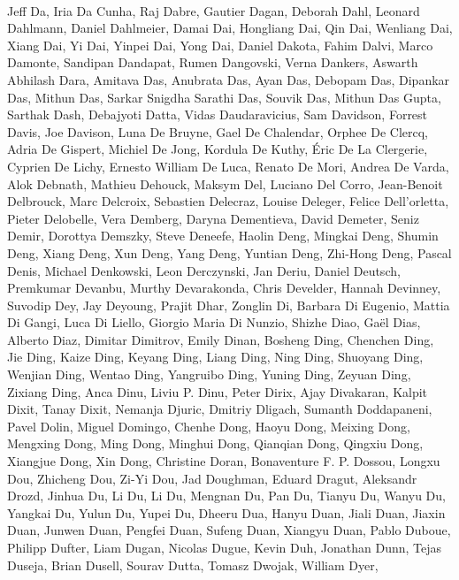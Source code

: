 \paragraph{}Jeff Da, Iria Da Cunha, Raj Dabre, Gautier Dagan, Deborah Dahl, Leonard Dahlmann, Daniel Dahlmeier, Damai Dai, Hongliang Dai, Qin Dai, Wenliang Dai, Xiang Dai, Yi Dai, Yinpei Dai, Yong Dai, Daniel Dakota, Fahim Dalvi, Marco Damonte, Sandipan Dandapat, Rumen Dangovski, Verna Dankers, Aswarth Abhilash Dara, Amitava Das, Anubrata Das, Ayan Das, Debopam Das, Dipankar Das, Mithun Das, Sarkar Snigdha Sarathi Das, Souvik Das, Mithun Das Gupta, Sarthak Dash, Debajyoti Datta, Vidas Daudaravicius, Sam Davidson, Forrest Davis, Joe Davison, Luna De Bruyne, Gael De Chalendar, Orphee De Clercq, Adria De Gispert, Michiel De Jong, Kordula De Kuthy, Éric De La Clergerie, Cyprien De Lichy, Ernesto William De Luca, Renato De Mori, Andrea De Varda, Alok Debnath, Mathieu Dehouck, Maksym Del, Luciano Del Corro, Jean-Benoit Delbrouck, Marc Delcroix, Sebastien Delecraz, Louise Deleger, Felice Dell'orletta, Pieter Delobelle, Vera Demberg, Daryna Dementieva, David Demeter, Seniz Demir, Dorottya Demszky, Steve Deneefe, Haolin Deng, Mingkai Deng, Shumin Deng, Xiang Deng, Xun Deng, Yang Deng, Yuntian Deng, Zhi-Hong Deng, Pascal Denis, Michael Denkowski, Leon Derczynski, Jan Deriu, Daniel Deutsch, Premkumar Devanbu, Murthy Devarakonda, Chris Develder, Hannah Devinney, Suvodip Dey, Jay Deyoung, Prajit Dhar, Zonglin Di, Barbara Di Eugenio, Mattia Di Gangi, Luca Di Liello, Giorgio Maria Di Nunzio, Shizhe Diao, Gaël Dias, Alberto Diaz, Dimitar Dimitrov, Emily Dinan, Bosheng Ding, Chenchen Ding, Jie Ding, Kaize Ding, Keyang Ding, Liang Ding, Ning Ding, Shuoyang Ding, Wenjian Ding, Wentao Ding, Yangruibo Ding, Yuning Ding, Zeyuan Ding, Zixiang Ding, Anca Dinu, Liviu P. Dinu, Peter Dirix, Ajay Divakaran, Kalpit Dixit, Tanay Dixit, Nemanja Djuric, Dmitriy Dligach, Sumanth Doddapaneni, Pavel Dolin, Miguel Domingo, Chenhe Dong, Haoyu Dong, Meixing Dong, Mengxing Dong, Ming Dong, Minghui Dong, Qianqian Dong, Qingxiu Dong, Xiangjue Dong, Xin Dong, Christine Doran, Bonaventure F. P. Dossou, Longxu Dou, Zhicheng Dou, Zi-Yi Dou, Jad Doughman, Eduard Dragut, Aleksandr Drozd, Jinhua Du, Li Du, Li Du, Mengnan Du, Pan Du, Tianyu Du, Wanyu Du, Yangkai Du, Yulun Du, Yupei Du, Dheeru Dua, Hanyu Duan, Jiali Duan, Jiaxin Duan, Junwen Duan, Pengfei Duan, Sufeng Duan, Xiangyu Duan, Pablo Duboue, Philipp Dufter, Liam Dugan, Nicolas Dugue, Kevin Duh, Jonathan Dunn, Tejas Duseja, Brian Dusell, Sourav Dutta, Tomasz Dwojak, William Dyer,
